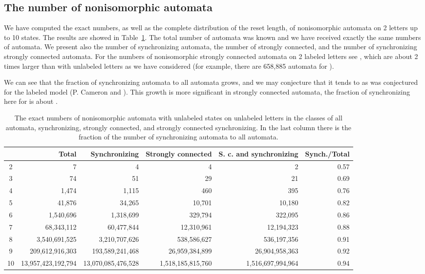 \documentclass[runningheads,a4paper]{llncs}
\newcommand{\<}{\langle}
\renewcommand{\>}{\rangle}
\begin{document}
\subsection{The number of nonisomorphic automata}
We have computed the exact numbers, as well as the complete distribution of the reset length, of nonisomorphic automata on 2 letters up to 10 states. The results are showed in Table~\ref{tab:aut_counts_k2}. The total number of automata was known \cite{Ha1965} and we have received exactly the same numbers of automata. We present also the number of synchronizing automata, the number of strongly connected, and the number of synchronizing strongly connected automata. For the numbers of nonisomorphic strongly connected automata on 2 labeled letters see \cite{Li1971}, which are about 2 times larger than with unlabeled letters as we have considered (for example, there are 658,885 automata for ).

We can see that the fraction of synchronizing automata to all automata grows, and we may conjecture that it tends to  as was conjectured for the labeled model (P. Cameron and \cite{ST2011}). This growth is more significant in strongly connected automata, the fraction of synchronizing here for  is about .

\begin{table}\label{tab:aut_counts_k2}
\centering
\caption{The exact numbers of nonisomorphic automata with  unlabeled states on  unlabeled letters in the classes of all automata, synchronizing, strongly connected, and strongly connected synchronizing. In the last column there is the fraction of the number of synchronizing automata to all automata.}
\begin{tabular}{|c|r|r|r|r|r|} \hline
 & Total              & Synchronizing      & Strongly connected & S. c. and synchronizing & Synch./Total \\ \hline
2   &                  7 &                  4 &                  4 &                 2 & 0.57 \\ \hline
3   &                 74 &                 51 &                 29 &                21 & 0.69 \\ \hline
4   &              1,474 &              1,115 &                460 &               395 & 0.76 \\ \hline
5   &             41,876 &             34,265 &             10,701 &            10,180 & 0.82 \\ \hline
6   &          1,540,696 &          1,318,699 &            329,794 &           322,095 & 0.86 \\ \hline
7   &         68,343,112 &         60,477,844 &         12,310,961 &        12,194,323 & 0.88 \\ \hline
8   &      3,540,691,525 &      3,210,707,626 &        538,586,627 &       536,197,356 & 0.91 \\ \hline
9   &    209,612,916,303 &    193,589,241,468 &     26,959,384,899 &    26,904,958,363 & 0.92 \\ \hline
10  & 13,957,423,192,794 & 13,070,085,476,528 &  1,518,185,815,760 & 1,516,697,994,964 & 0.94 \\ \hline
\end{tabular}
\end{table}
\end{document}
